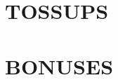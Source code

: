 \documentclass[10pt]{article}
\begin{document}
\section{TOSSUPS}

\begin{tossup}
\end{tossup}


\section{BONUSES}

\begin{bonus}
\end{bonus}
\end{document}
